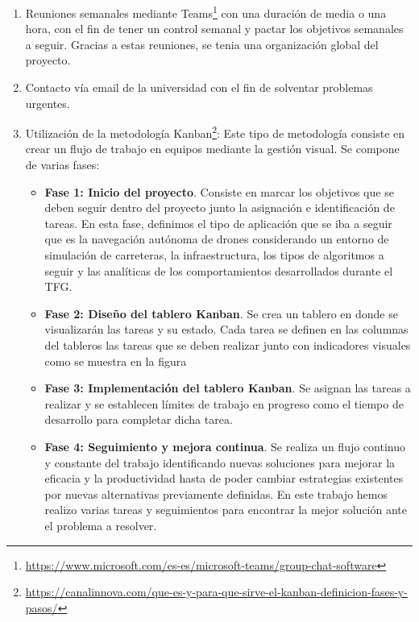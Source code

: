 \begin{enumerate}
    \item Reuniones semanales mediante Teams\footnote{\url{https://www.microsoft.com/es-es/microsoft-teams/group-chat-software}} con una duración de media o una hora, con el fin de tener un control semanal y pactar los objetivos semanales a seguir. Gracias a estas reuniones, se tenia una organización global del proyecto. 
    \item Contacto vía email de la universidad con el fin de solventar problemas urgentes. 
    \item Utilización de la metodología Kanban\footnote{\url{https://canalinnova.com/que-es-y-para-que-sirve-el-kanban-definicion-fases-y-pasos/}}: Este tipo de metodología consiste en crear un flujo de trabajo
    en equipos mediante la gestión visual. Se compone de varias fases:
  
    \begin{itemize}
      \item \textbf{Fase 1: Inicio del proyecto}. Consiste en marcar los objetivos que se deben seguir dentro del proyecto junto la asignación e identificación de tareas. En esta fase, 
      definimos el tipo de aplicación que se iba a seguir que es la navegación autónoma de drones considerando un entorno de simulación de carreteras, la infraestructura, los tipos 
      de algoritmos a seguir y las analíticas de los comportamientos desarrollados durante el TFG. \newline
      \item \textbf{Fase 2: Diseño del tablero Kanban}. Se crea un tablero en donde se visualizarán las tareas y su estado. Cada tarea se definen en las columnas del tableros las
      tareas que se deben realizar junto con indicadores visuales como se muestra en la figura \newline
      \item \textbf{Fase 3: Implementación del tablero Kanban}. Se asignan las tareas a realizar y se establecen límites de trabajo en progreso como el tiempo de desarrollo para 
      completar dicha tarea. \newline
      \item \textbf{Fase 4: Seguimiento y mejora continua}. Se realiza un flujo continuo y constante del trabajo identificando nuevas soluciones para mejorar la eficacia y la 
      productividad hasta de poder cambiar estrategias existentes por nuevas alternativas previamente definidas. En este trabajo hemos realizo varias tareas y seguimientos para encontrar
      la mejor solución ante el problema a resolver.\newline


\end{itemize}
\end{enumerate}
